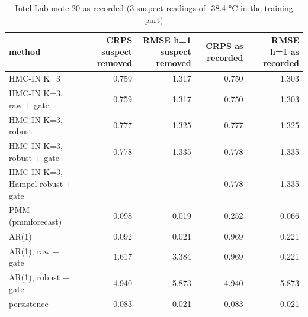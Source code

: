 \begin{table}[ht]\centering\small
\caption{Intel Lab mote 20 as recorded (3 suspect readings of -38.4 °C in the training part)}
\begin{tabular}{lrrrr}
\hline
method & CRPS suspect removed & RMSE h=1 suspect removed & CRPS as recorded & RMSE h=1 as recorded \\ \hline
HMC-IN K=3 & 0.759 & 1.317 & 0.750 & 1.303 \\
HMC-IN K=3, raw + gate & 0.759 & 1.317 & 0.750 & 1.303 \\
HMC-IN K=3, robust & 0.777 & 1.325 & 0.777 & 1.325 \\
HMC-IN K=3, robust + gate & 0.778 & 1.335 & 0.778 & 1.335 \\
HMC-IN K=3, Hampel robust + gate & – & – & 0.778 & 1.335 \\
PMM (pmmforecast) & 0.098 & 0.019 & 0.252 & 0.066 \\
AR(1) & 0.092 & 0.021 & 0.969 & 0.221 \\
AR(1), raw + gate & 1.617 & 3.384 & 0.969 & 0.221 \\
AR(1), robust + gate & 4.940 & 5.873 & 4.940 & 5.873 \\
persistence & 0.083 & 0.021 & 0.083 & 0.021 \\
\hline\end{tabular}\end{table}
